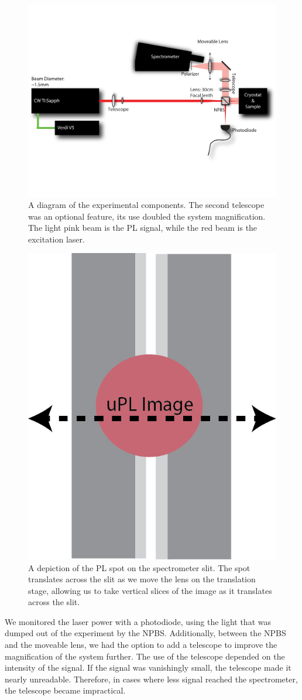 \begin{figure}[h!]
\centering
\includegraphics[width = \textwidth]{upl.pdf}
\caption{ \doublespacing A diagram of the experimental components. The second telescope was an optional feature, its use doubled the system magnification. The light pink beam is the PL signal, while the red beam is the excitation laser.}
\label{upl}
\end{figure}
\begin{figure}[h!]
\centering
\includegraphics[width = .3\textwidth]{SpecSlit.png}
\caption{ \doublespacing A depiction of the PL spot on the spectrometer slit. The spot translates across the slit as we move the lens on the translation stage, allowing us to take vertical slices of the image as it translates across the slit.}
\label{slit}
\end{figure}
\newpage
\indent We monitored the laser power with a photodiode, using the light that was dumped out of the experiment by the NPBS. Additionally, between the NPBS and the moveable lens, we had the option to add a telescope to improve the magnification of the system further. The use of the telescope depended on the intensity of the signal. If the signal was vanishingly small, the telescope made it nearly unreadable. Therefore, in cases where less signal reached the spectrometer, the telescope became impractical.

